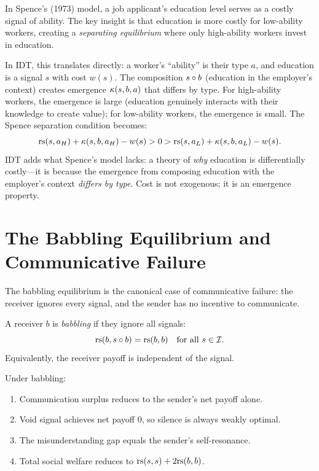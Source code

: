 \begin{interpretation}
In Spence's (1973) model, a job applicant's education level serves as a
costly signal of ability. The key insight is that education is more
costly for low-ability workers, creating a \emph{separating equilibrium}
where only high-ability workers invest in education.

In IDT, this translates directly: a worker's ``ability'' is their type
$a$, and education is a signal $s$ with cost $w(s)$. The composition
$s \circ b$ (education in the employer's context) creates emergence
$\kappa(s, b, a)$ that differs by type. For high-ability workers, the
emergence is large (education genuinely interacts with their knowledge
to create value); for low-ability workers, the emergence is small.
The Spence separation condition becomes:
\[
\mathrm{rs}(s, a_H) + \kappa(s, b, a_H) - w(s) > 0 >
\mathrm{rs}(s, a_L) + \kappa(s, b, a_L) - w(s).
\]
IDT adds what Spence's model lacks: a theory of \emph{why} education
is differentially costly---it is because the emergence from composing
education with the employer's context \emph{differs by type}. Cost is
not exogenous; it is an emergence property.
\end{interpretation}


\section{The Babbling Equilibrium and Communicative Failure}

The babbling equilibrium is the canonical case of communicative failure:
the receiver ignores every signal, and the sender has no incentive to
communicate.

\begin{definition}
\label{def:babbling}
A receiver $b$ is \emph{babbling} if they ignore all signals:
\[
\mathrm{rs}(b, s \circ b) = \mathrm{rs}(b, b) \quad \text{for all } s \in \mathcal{I}.
\]
Equivalently, the receiver payoff is independent of the signal.
\end{definition}

\begin{theorem}
\label{thm:babbling-properties}
Under babbling:
\begin{enumerate}
\item Communication surplus reduces to the sender's net payoff alone.
\item Void signal achieves net payoff $0$, so silence is always weakly optimal.
\item The misunderstanding gap equals the sender's self-resonance.
\item Total social welfare reduces to $\mathrm{rs}(s, s) + 2\mathrm{rs}(b, b)$.
\end{enumerate}
\end{theorem}

